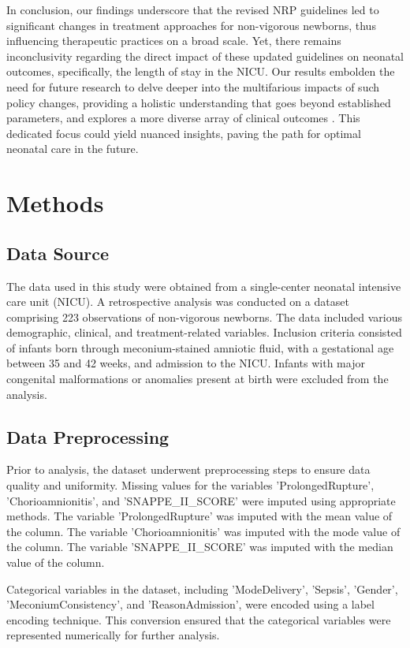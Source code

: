 \documentclass[11pt]{article}
\begin{document}
In conclusion, our findings underscore that the revised NRP guidelines led to significant changes in treatment approaches for non-vigorous newborns, thus influencing therapeutic practices on a broad scale. Yet, there remains inconclusivity regarding the direct impact of these updated guidelines on neonatal outcomes, specifically, the length of stay in the NICU. Our results embolden the need for future research to delve deeper into the multifarious impacts of such policy changes, providing a holistic understanding that goes beyond established parameters, and explores a more diverse array of clinical outcomes \cite{Gulczyska2015PRACTICALAO}. This dedicated focus could yield nuanced insights, paving the path for optimal neonatal care in the future.

\section*{Methods}

\subsection*{Data Source}
The data used in this study were obtained from a single-center neonatal intensive care unit (NICU). A retrospective analysis was conducted on a dataset comprising 223 observations of non-vigorous newborns. The data included various demographic, clinical, and treatment-related variables. Inclusion criteria consisted of infants born through meconium-stained amniotic fluid, with a gestational age between 35 and 42 weeks, and admission to the NICU. Infants with major congenital malformations or anomalies present at birth were excluded from the analysis.

\subsection*{Data Preprocessing}
Prior to analysis, the dataset underwent preprocessing steps to ensure data quality and uniformity. Missing values for the variables 'ProlongedRupture', 'Chorioamnionitis', and 'SNAPPE\_II\_SCORE' were imputed using appropriate methods. The variable 'ProlongedRupture' was imputed with the mean value of the column. The variable 'Chorioamnionitis' was imputed with the mode value of the column. The variable 'SNAPPE\_II\_SCORE' was imputed with the median value of the column.

Categorical variables in the dataset, including 'ModeDelivery', 'Sepsis', 'Gender', 'MeconiumConsistency', and 'ReasonAdmission', were encoded using a label encoding technique. This conversion ensured that the categorical variables were represented numerically for further analysis.
\end{document}
